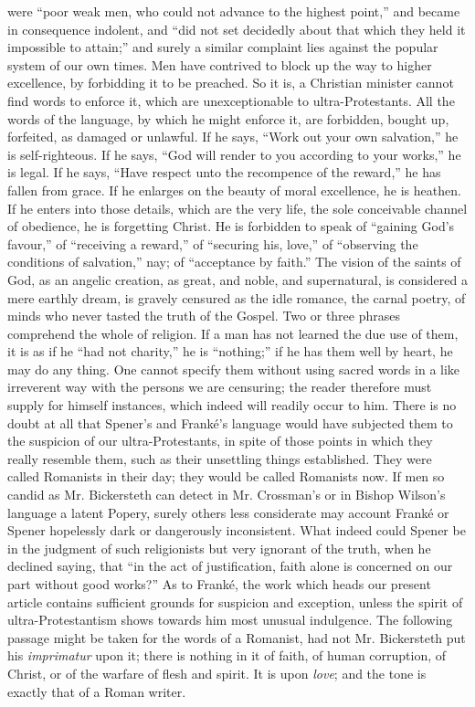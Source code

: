were ``poor weak men, who could not advance to the highest point,'' and
became in consequence indolent, and ``did not set decidedly about that
which they held it impossible to attain;'' and surely a similar complaint
lies against the popular system of our own times. Men have contrived to
block up the way to higher excellence, by forbidding it to be preached.
So it is, a Christian minister cannot find words to enforce it, which
are unexceptionable to ultra-Protestants. All the words of the language,
by which he might enforce it, are forbidden, bought up, forfeited, as
damaged or unlawful. If he says, ``Work out your own salvation,'' he is
self-righteous. If he says, ``God will render to you according to your
works,'' he is legal. If he says, ``Have respect unto the recompence of
the reward,'' he has fallen from grace. If he enlarges on the beauty of
moral excellence, he is heathen. If he enters into those details, which
are the very life, the sole conceivable channel of obedience, he is
forgetting Christ. He is forbidden to speak of ``gaining God's favour,''
of ``receiving a reward,'' of ``securing his, love,'' of ``observing the
conditions of salvation,'' nay; of ``acceptance by faith.'' The vision of
the saints of God, as an angelic creation, as great, and noble, and
supernatural, is considered a mere earthly dream, is gravely censured as
the idle romance, the carnal poetry, of minds who never tasted the truth
of the Gospel. Two or three phrases comprehend the whole of religion. If a man has not learned the due use of them, it is as if he ``had
not charity,'' he is ``nothing;'' if he has them well by heart, he may do
any thing. One cannot specify them without using sacred words in a like
irreverent way with the persons we are censuring; the reader therefore
must supply for himself instances, which indeed will readily occur to
him. There is no doubt at all that Spener's and Franké's language would
have subjected them to the suspicion of our ultra-Protestants, in spite
of those points in which they really resemble them, such as their
unsettling things established. They were called Romanists in their day;
they would be called Romanists now. If men so candid as Mr. Bickersteth
can detect in Mr. Crossman's or in Bishop Wilson's language a latent
Popery, surely others less considerate may account Franké or Spener
hopelessly dark or dangerously inconsistent. What indeed could Spener be
in the judgment of such religionists but very ignorant of the truth,
when he declined saying, that ``in the act of justification, faith alone
is concerned on our part without good works?'' As to Franké, the work
which heads our present article contains sufficient grounds for
suspicion and exception, unless the spirit of ultra-Protestantism shows
towards him most unusual indulgence. The following passage might be
taken for the words of a Romanist, had not Mr. Bickersteth put his \emph{imprimatur}
upon it; there is nothing in it of faith, of human corruption, of
Christ, or of the warfare of flesh and spirit. It is upon \emph{love};
and the tone is exactly that of a Roman writer.

